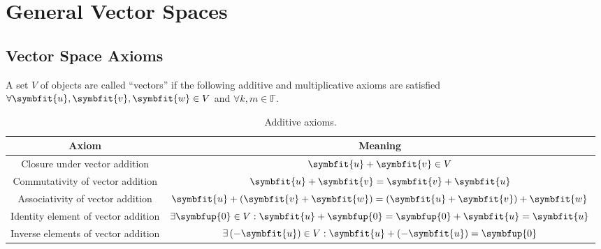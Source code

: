\documentclass{article}
\begin{document}
\section{General Vector Spaces}
\subsection{Vector Space Axioms}
A set \(V\) of objects are called ``vectors'' if the following additive and multiplicative axioms
are satisfied \(\forall \symbfit{u}, \symbfit{v}, \symbfit{w} \in V\) and \(\forall k, m \in \mathbb{F}\).
\begin{table}[H]
    \centering
    \begin{tabular}{c c}
        \toprule
        \textbf{Axiom}                      & \textbf{Meaning}                                                                                                    \\
        \midrule
        Closure under vector addition       & \(\symbfit{u} + \symbfit{v} \in V\)                                                                                 \\
        Commutativity of vector addition    & \(\symbfit{u} + \symbfit{v} = \symbfit{v} + \symbfit{u}\)                                                           \\
        Associativity of vector addition    & \(\symbfit{u} + \left( \symbfit{v} + \symbfit{w} \right) = \left( \symbfit{u} + \symbfit{v} \right) + \symbfit{w}\) \\
        Identity element of vector addition & \(\exists \symbfup{0} \in V : \symbfit{u} + \symbfup{0} = \symbfup{0} + \symbfit{u} = \symbfit{u}\)                 \\
        Inverse elements of vector addition & \(\exists \left( -\symbfit{u} \right) \in V : \symbfit{u} + \left( -\symbfit{u} \right) = \symbfup{0}\)             \\
        \bottomrule
    \end{tabular}
    \caption{Additive axioms.} %
\end{table}
\end{document}
